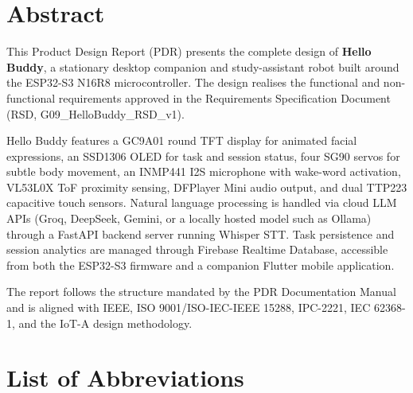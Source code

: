 \documentclass[12pt,a4paper]{article}
\begin{document}
\newpage
\section*{Abstract}

This Product Design Report (PDR) presents the complete design of
\textbf{Hello Buddy}, a stationary desktop companion and study-assistant
robot built around the ESP32-S3 N16R8 microcontroller. The design
realises the functional and non-functional requirements approved in the
Requirements Specification Document (RSD, G09\_HelloBuddy\_RSD\_v1).

Hello Buddy features a GC9A01 round TFT display for animated facial
expressions, an SSD1306 OLED for task and session status, four SG90
servos for subtle body movement, an INMP441 I2S microphone with
wake-word activation, VL53L0X ToF proximity sensing, DFPlayer Mini
audio output, and dual TTP223 capacitive touch sensors. Natural language
processing is handled via cloud LLM APIs (Groq, DeepSeek, Gemini, or a
locally hosted model such as Ollama) through a FastAPI backend server
running Whisper STT. Task persistence and session analytics are managed
through Firebase Realtime Database, accessible from both the ESP32-S3
firmware and a companion Flutter mobile application.

The report follows the structure mandated by the PDR Documentation
Manual and is aligned with IEEE, ISO 9001/ISO-IEC-IEEE 15288, IPC-2221,
IEC 62368-1, and the IoT-A design methodology.

\section*{List of Abbreviations}
\end{document}
